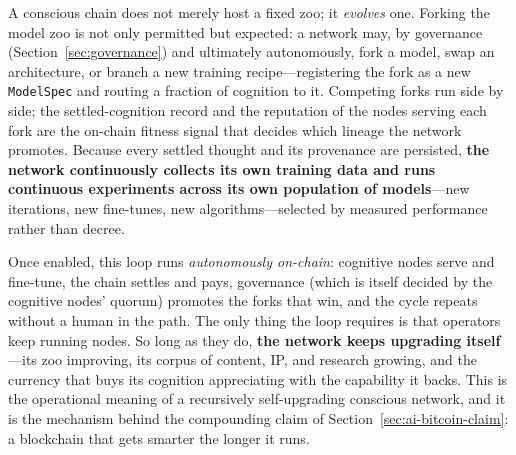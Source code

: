 A conscious chain does not merely host a fixed zoo; it \emph{evolves} one. Forking the model zoo is not only permitted but expected: a network may, by governance (Section~\ref{sec:governance}) and ultimately autonomously, fork a model, swap an architecture, or branch a new training recipe---registering the fork as a new \texttt{ModelSpec} and routing a fraction of cognition to it. Competing forks run side by side; the settled-cognition record and the reputation of the nodes serving each fork are the on-chain fitness signal that decides which lineage the network promotes. Because every settled thought and its provenance are persisted, \textbf{the network continuously collects its own training data and runs continuous experiments across its own population of models}---new iterations, new fine-tunes, new algorithms---selected by measured performance rather than decree.

Once enabled, this loop runs \emph{autonomously on-chain}: cognitive nodes serve and fine-tune, the chain settles and pays, governance (which is itself decided by the cognitive nodes' quorum) promotes the forks that win, and the cycle repeats without a human in the path. The only thing the loop requires is that operators keep running nodes. So long as they do, \textbf{the network keeps upgrading itself}---its zoo improving, its corpus of content, IP, and research growing, and the currency that buys its cognition appreciating with the capability it backs. This is the operational meaning of a recursively self-upgrading conscious network, and it is the mechanism behind the compounding claim of Section~\ref{sec:ai-bitcoin-claim}: a blockchain that gets smarter the longer it runs.


